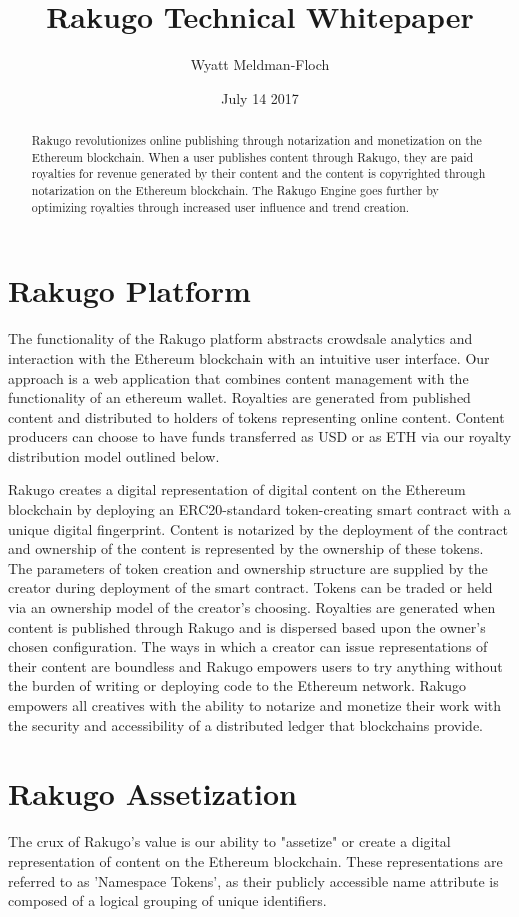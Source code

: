 \documentclass{article}
\title{Rakugo Technical Whitepaper}
\author{Wyatt Meldman-Floch}
\date{July 14 2017}
\begin{document}
\maketitle

\begin{abstract}
Rakugo revolutionizes online publishing through notarization and monetization on the Ethereum blockchain. When a user publishes content through Rakugo, they are paid royalties for revenue generated by their content and the content is copyrighted through notarization on the Ethereum blockchain. The Rakugo Engine goes further by optimizing royalties through increased user influence and trend creation.

\end{abstract}

\section{Rakugo Platform}
The functionality of the Rakugo platform abstracts crowdsale analytics and interaction with the Ethereum blockchain with an intuitive user interface. Our approach is a web application that combines content management with the functionality of an ethereum wallet. Royalties are generated from published content and distributed to holders of tokens representing online content. Content producers can choose to have funds transferred as USD or as ETH via our royalty distribution model outlined below.


Rakugo creates a digital representation of digital content on the Ethereum blockchain by deploying an ERC20-standard token-creating smart contract with a unique digital fingerprint. Content is notarized by the deployment of the contract and ownership of the content is represented by the ownership of these tokens. The parameters of token creation and ownership structure are supplied by the creator during deployment of the smart contract. Tokens can be traded or held via an ownership model of the creator's choosing. Royalties are generated when content is published through Rakugo and is dispersed based upon the owner's chosen configuration.
The ways in which a creator can issue representations of their content are boundless and Rakugo empowers users to try anything without the burden of writing or deploying code to the Ethereum network. 
Rakugo empowers all creatives with the ability to notarize and monetize their work with the security and accessibility of a distributed ledger that blockchains provide.


\section{Rakugo Assetization}
The crux of Rakugo’s value is our ability to "assetize" or create a digital representation of content on the Ethereum blockchain. These representations are referred to as 'Namespace Tokens', as their publicly accessible name attribute is composed of a logical grouping of unique identifiers.
\end{document}

